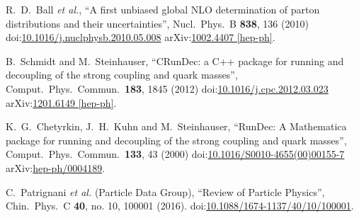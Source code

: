 \begin{thebibliography}{99}
R.~D.~Ball {\it et al.}, ``A first unbiased global NLO determination of parton distributions and their uncertainties'', Nucl.\ Phys.\ B {\bf 838}, 136 (2010) doi:\href{http://dx.doi.org/10.1016/j.nuclphysb.2010.05.008}{10.1016/j.nuclphysb.2010.05.008} arXiv:\href{https://arxiv.org/abs/1002.4407}{1002.4407 [hep-ph]}.

B.~Schmidt and M.~Steinhauser, ``CRunDec: a C++ package for running and decoupling of the strong coupling and quark masses'', Comput.\ Phys.\ Commun.\ {\bf 183}, 1845 (2012) doi:\href{http://dx.doi.org/10.1016/j.cpc.2012.03.023}{10.1016/j.cpc.2012.03.023} arXiv:\href{https://arxiv.org/abs/1201.6149}{1201.6149 [hep-ph]}.

K.~G.~Chetyrkin, J.~H.~Kuhn and M.~Steinhauser, ``RunDec: A Mathematica package for running and decoupling of the strong coupling and quark masses'', Comput.\ Phys.\ Commun.\ {\bf 133}, 43 (2000) doi:\href{http://dx.doi.org/10.1016/S0010-4655(00)00155-7}{10.1016/S0010-4655(00)00155-7} arXiv:\href{https://arxiv.org/abs/hep-ph/0004189}{hep-ph/0004189}.

C.~Patrignani {\it et al.} (Particle Data Group), ``Review of Particle Physics'', Chin.\ Phys.\ C {\bf 40}, no. 10, 100001 (2016). doi:\href{http://dx.doi.org/10.1088/1674-1137/40/10/100001}{10.1088/1674-1137/40/10/100001}.


\end{thebibliography}

